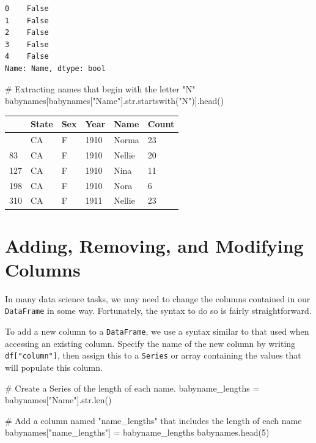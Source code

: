 \documentclass[
  letterpaper,
  DIV=11,
  numbers=noendperiod]{scrreprt}
\newenvironment{Shaded}{\begin{snugshade}}{\end{snugshade}}
\newcommand{\BuiltInTok}[1]{\textcolor[rgb]{0.00,0.23,0.31}{#1}}
\newcommand{\CommentTok}[1]{\textcolor[rgb]{0.37,0.37,0.37}{#1}}
\newcommand{\DecValTok}[1]{\textcolor[rgb]{0.68,0.00,0.00}{#1}}
\newcommand{\NormalTok}[1]{\textcolor[rgb]{0.00,0.23,0.31}{#1}}
\newcommand{\OperatorTok}[1]{\textcolor[rgb]{0.37,0.37,0.37}{#1}}
\newcommand{\StringTok}[1]{\textcolor[rgb]{0.13,0.47,0.30}{#1}}
\begin{document}
\begin{verbatim}
0    False
1    False
2    False
3    False
4    False
Name: Name, dtype: bool
\end{verbatim}

\begin{Shaded}
\begin{Highlighting}[]
\CommentTok{\# Extracting names that begin with the letter "N"}
\NormalTok{babynames[babynames[}\StringTok{"Name"}\NormalTok{].}\BuiltInTok{str}\NormalTok{.startswith(}\StringTok{"N"}\NormalTok{)].head()}
\end{Highlighting}
\end{Shaded}

\begin{longtable}[]{@{}llllll@{}}
\toprule\noalign{}
& State & Sex & Year & Name & Count \\
\midrule\noalign{}
\endhead
\bottomrule\noalign{}
\endlastfoot
76 & CA & F & 1910 & Norma & 23 \\
83 & CA & F & 1910 & Nellie & 20 \\
127 & CA & F & 1910 & Nina & 11 \\
198 & CA & F & 1910 & Nora & 6 \\
310 & CA & F & 1911 & Nellie & 23 \\
\end{longtable}

\section{Adding, Removing, and Modifying
Columns}\label{adding-removing-and-modifying-columns}

In many data science tasks, we may need to change the columns contained
in our \texttt{DataFrame} in some way. Fortunately, the syntax to do so
is fairly straightforward.

To add a new column to a \texttt{DataFrame}, we use a syntax similar to
that used when accessing an existing column. Specify the name of the new
column by writing \texttt{df{[}"column"{]}}, then assign this to a
\texttt{Series} or array containing the values that will populate this
column.

\begin{Shaded}
\begin{Highlighting}[]
\CommentTok{\# Create a Series of the length of each name. }
\NormalTok{babyname\_lengths }\OperatorTok{=}\NormalTok{ babynames[}\StringTok{"Name"}\NormalTok{].}\BuiltInTok{str}\NormalTok{.}\BuiltInTok{len}\NormalTok{()}

\CommentTok{\# Add a column named "name\_lengths" that includes the length of each name}
\NormalTok{babynames[}\StringTok{"name\_lengths"}\NormalTok{] }\OperatorTok{=}\NormalTok{ babyname\_lengths}
\NormalTok{babynames.head(}\DecValTok{5}\NormalTok{)}
\end{Highlighting}
\end{Shaded}
\end{document}
